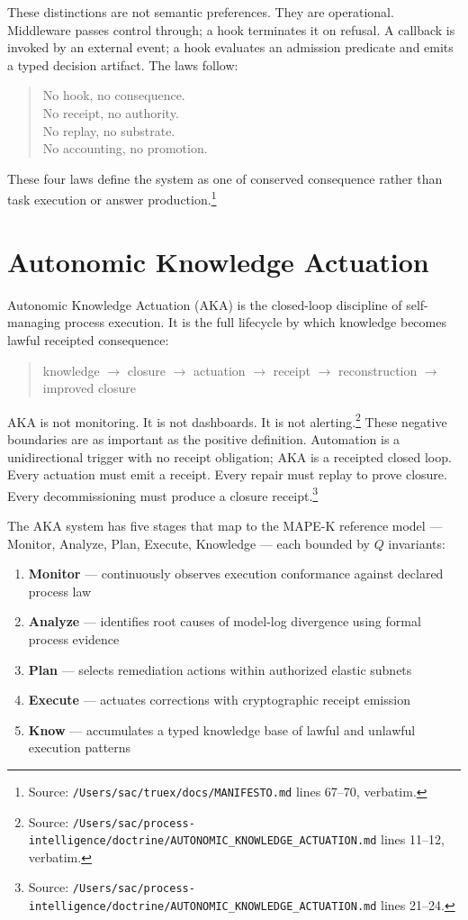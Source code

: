 These distinctions are not semantic preferences. They are operational. Middleware passes
control through; a hook terminates it on refusal. A callback is invoked by an external
event; a hook evaluates an admission predicate and emits a typed decision artifact. The
laws follow:

\begin{quote}
  No hook, no consequence.\\
  No receipt, no authority.\\
  No replay, no substrate.\\
  No accounting, no promotion.
\end{quote}

\noindent These four laws define the system as one of conserved consequence rather than task
execution or answer production.\footnote{Source: \texttt{/Users/sac/truex/docs/MANIFESTO.md}
lines 67--70, verbatim.}

\section{Autonomic Knowledge Actuation}
\label{sec:aka}

Autonomic Knowledge Actuation (AKA) is the closed-loop discipline of self-managing process
execution. It is the full lifecycle by which knowledge becomes lawful receipted consequence:

\begin{quote}
  knowledge $\to$ closure $\to$ actuation $\to$ receipt $\to$ reconstruction $\to$ improved closure
\end{quote}

AKA is not monitoring. It is not dashboards. It is not alerting.\footnote{Source:
\texttt{/Users/sac/process-intelligence/doctrine/AUTONOMIC\_KNOWLEDGE\_ACTUATION.md} lines 11--12,
verbatim.} These negative boundaries are as important as the positive definition.
Automation is a unidirectional trigger with no receipt obligation; AKA is a receipted closed
loop. Every actuation must emit a receipt. Every repair must replay to prove closure. Every
decommissioning must produce a closure receipt.\footnote{Source:
\texttt{/Users/sac/process-intelligence/doctrine/AUTONOMIC\_KNOWLEDGE\_ACTUATION.md} lines 21--24.}

The AKA system has five stages that map to the MAPE-K reference model \citep{kephart2003vision}
--- Monitor, Analyze, Plan, Execute, Knowledge --- each bounded by $Q$ invariants:

\begin{enumerate}
  \item \textbf{Monitor} --- continuously observes execution conformance against declared process law
  \item \textbf{Analyze} --- identifies root causes of model-log divergence using formal process evidence
  \item \textbf{Plan} --- selects remediation actions within authorized elastic subnets
  \item \textbf{Execute} --- actuates corrections with cryptographic receipt emission
  \item \textbf{Know} --- accumulates a typed knowledge base of lawful and unlawful execution patterns
\end{enumerate}


